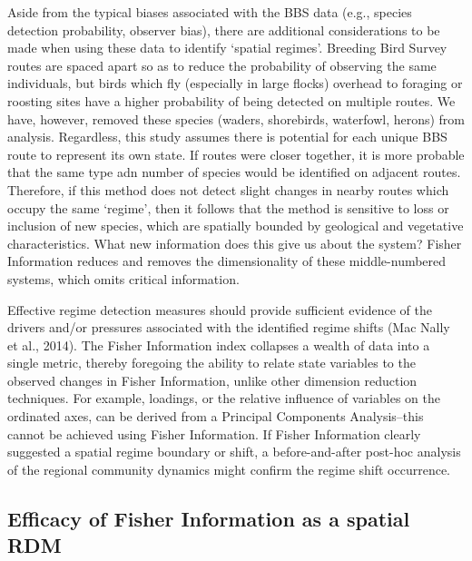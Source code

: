 \documentclass[12pt,twoside,openany]{reedthesis}
\begin{document}
Aside from the typical biases associated with the BBS data (e.g.,
species detection probability, observer bias), there are additional
considerations to be made when using these data to identify `spatial
regimes'. Breeding Bird Survey routes are spaced apart so as to reduce
the probability of observing the same individuals, but birds which fly
(especially in large flocks) overhead to foraging or roosting sites have
a higher probability of being detected on multiple routes. We have,
however, removed these species (waders, shorebirds, waterfowl, herons)
from analysis. Regardless, this study assumes there is potential for
each unique BBS route to represent its own state. If routes were closer
together, it is more probable that the same type adn number of species
would be identified on adjacent routes. Therefore, if this method does
not detect slight changes in nearby routes which occupy the same
`regime', then it follows that the method is sensitive to loss or
inclusion of new species, which are spatially bounded by geological and
vegetative characteristics. What new information does this give us about
the system? Fisher Information reduces and removes the dimensionality of
these middle-numbered systems, which omits critical information.

Effective regime detection measures should provide sufficient evidence
of the drivers and/or pressures associated with the identified regime
shifts (Mac Nally et al., 2014). The Fisher Information index collapses
a wealth of data into a single metric, thereby foregoing the ability to
relate state variables to the observed changes in Fisher Information,
unlike other dimension reduction techniques. For example, loadings, or
the relative influence of variables on the ordinated axes, can be
derived from a Principal Components Analysis--this cannot be achieved
using Fisher Information. If Fisher Information clearly suggested a
spatial regime boundary or shift, a before-and-after post-hoc analysis
of the regional community dynamics might confirm the regime shift
occurrence.

\subsection{Efficacy of Fisher Information as a spatial
RDM}\label{efficacy-of-fisher-information-as-a-spatial-rdm}
\end{document}
